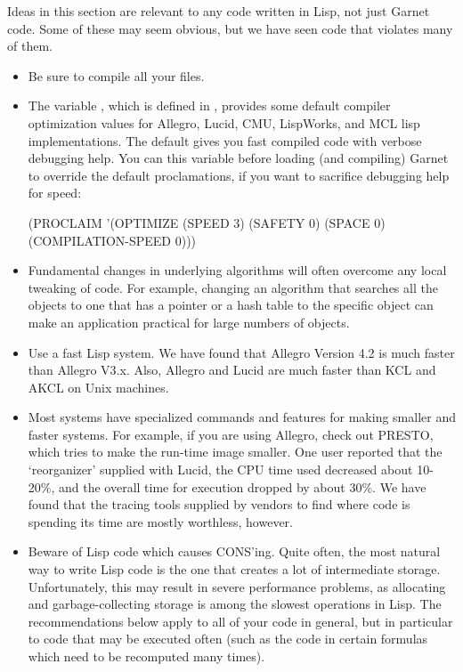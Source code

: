 Ideas in this section are relevant to any code written in Lisp, not
just Garnet code.  Some of these may seem obvious, but we have seen
code that violates many of them.

\begin{itemize}
\item Be sure to compile all your files.

\item 
The variable , which is defined in
, provides some default compiler optimization values
for Allegro, Lucid, CMU, LispWorks, and MCL lisp implementations.  The default
gives you fast compiled code with verbose debugging help.  You can 
this variable before loading (and compiling) Garnet to override the default
proclamations, if you want to sacrifice debugging help for speed:
\begin{programexample}
(PROCLAIM '(OPTIMIZE (SPEED 3) (SAFETY 0) (SPACE 0)
	             (COMPILATION-SPEED 0)))
\end{programexample}


\item Fundamental changes in underlying algorithms will often overcome any
local tweaking of code.  For example, changing an algorithm that
searches all the objects to one that has a pointer or a hash table to
the specific object can make an application practical for large
numbers of objects.

\item Use a fast Lisp system.  We have found that Allegro Version 4.2 is
much faster than Allegro V3.x.  Also, Allegro and Lucid are much
faster than KCL and AKCL on Unix machines.

\item Most systems have specialized commands and features for making smaller
and faster systems.  For example, if you are using
Allegro, check out PRESTO, which tries to make the run-time image
smaller.  One user reported that the `reorganizer' supplied with
Lucid, the CPU time used decreased about 10-20\%, and the overall
time for execution dropped by about 30\%.
We have found that the tracing tools supplied by vendors to
find where code is spending its time are mostly worthless, however.

\item Beware of Lisp code which causes CONS'ing.  Quite often, the most
natural way to write Lisp code is the one that creates a lot of
intermediate storage.  Unfortunately, this may result in severe
performance problems, as allocating and garbage-collecting storage is
among the slowest operations in Lisp.  The recommendations below apply
to all of your code in general, but in particular to code that
may be executed often (such as the code in certain formulas which need
to be recomputed many times).


\end{itemize}
